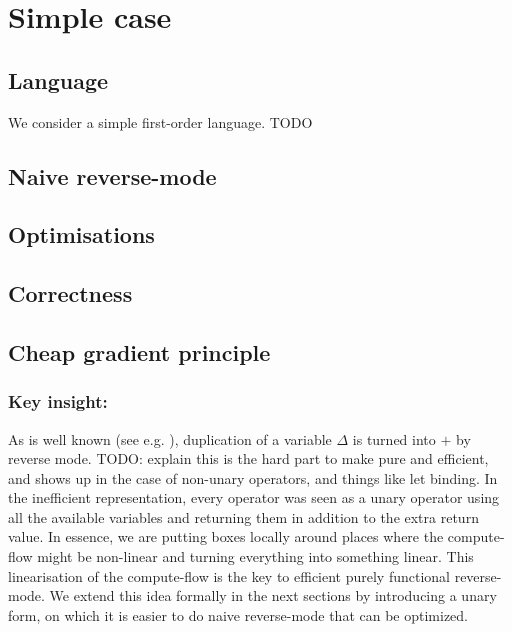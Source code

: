 \section{Simple case}

\subsection{Language}

We consider a simple first-order language. 
TODO

\subsection{Naive reverse-mode}


\subsection{Optimisations}


\subsection{Correctness}


\subsection{Cheap gradient principle}


\subsubsection*{Key insight:}

As is well known (see e.g. \cite{pearlmutter2008reverse}), duplication of a variable $\Delta$ is turned into $+$ by reverse mode.
TODO: explain this is the hard part to make pure and efficient, and shows up in the case of non-unary operators, and things like let binding.
In the inefficient representation, every operator was seen as a unary operator using all the available variables and returning them in addition to the extra return value. 
In essence, we are putting boxes locally around places where the compute-flow might be non-linear and turning everything into something linear.
This linearisation of the compute-flow is the key to efficient purely functional reverse-mode. We extend this idea formally in the next sections by introducing a unary form, 
on which it is easier to do naive reverse-mode that can be optimized. 